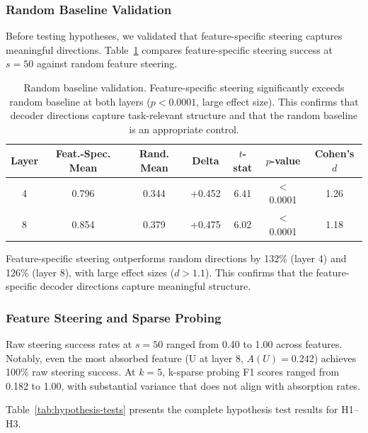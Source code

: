 \documentclass{article}
\begin{document}
\subsubsection{Random Baseline Validation}

Before testing hypotheses, we validated that feature-specific steering captures meaningful directions. Table~\ref{tab:random-baseline} compares feature-specific steering success at $s = 50$ against random feature steering.

\begin{table}[t]
\caption{Random baseline validation. Feature-specific steering significantly exceeds random baseline at both layers ($p < 0.0001$, large effect size). This confirms that decoder directions capture task-relevant structure and that the random baseline is an appropriate control.}
\label{tab:random-baseline}
\centering
\small
\setlength{\tabcolsep}{3pt}
\begin{tabular}{@{}ccccccc@{}}
\toprule
Layer & Feat.-Spec. Mean & Rand. Mean & Delta & $t$-stat & $p$-value & Cohen's $d$ \\
\midrule
4 & 0.796 & 0.344 & +0.452 & 6.41 & $<$0.0001 & 1.26 \\
8 & 0.854 & 0.379 & +0.475 & 6.02 & $<$0.0001 & 1.18 \\
\bottomrule
\end{tabular}
\end{table}

Feature-specific steering outperforms random directions by 132\% (layer 4) and 126\% (layer 8), with large effect sizes ($d > 1.1$). This confirms that the feature-specific decoder directions capture meaningful structure.

\subsubsection{Feature Steering and Sparse Probing}

Raw steering success rates at $s = 50$ ranged from 0.40 to 1.00 across features. Notably, even the most absorbed feature (U at layer 8, $A(U) = 0.242$) achieves 100\% raw steering success. At $k = 5$, k-sparse probing F1 scores ranged from 0.182 to 1.00, with substantial variance that does not align with absorption rates.

Table~\ref{tab:hypothesis-tests} presents the complete hypothesis test results for H1--H3.
\end{document}
